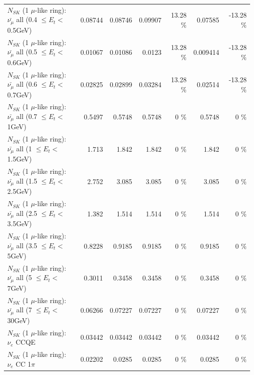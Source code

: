 \begin{table}
\begin{tabular}{| l | r | r | r  r | r  r |}
 $N_{SK}$ (1 $\mu$-like ring): $\bar{\nu_{\mu}}$ all (0.4 $\leq E_{t} <$ 0.5GeV) &         0.08744 &         0.08746 &         0.09907 &    13.28 \%  &         0.07585 &   -13.28 \%  \\ 
 $N_{SK}$ (1 $\mu$-like ring): $\bar{\nu_{\mu}}$ all (0.5 $\leq E_{t} <$ 0.6GeV) &         0.01067 &         0.01086 &          0.0123 &    13.28 \%  &        0.009414 &   -13.28 \%  \\ 
 $N_{SK}$ (1 $\mu$-like ring): $\bar{\nu_{\mu}}$ all (0.6 $\leq E_{t} <$ 0.7GeV) &         0.02825 &         0.02899 &         0.03284 &    13.28 \%  &         0.02514 &   -13.28 \%  \\ 
   $N_{SK}$ (1 $\mu$-like ring): $\bar{\nu_{\mu}}$ all (0.7 $\leq E_{t} <$ 1GeV) &          0.5497 &          0.5748 &          0.5748 &        0 \%  &          0.5748 &        0 \%  \\ 
   $N_{SK}$ (1 $\mu$-like ring): $\bar{\nu_{\mu}}$ all (1 $\leq E_{t} <$ 1.5GeV) &           1.713 &           1.842 &           1.842 &        0 \%  &           1.842 &        0 \%  \\ 
 $N_{SK}$ (1 $\mu$-like ring): $\bar{\nu_{\mu}}$ all (1.5 $\leq E_{t} <$ 2.5GeV) &           2.752 &           3.085 &           3.085 &        0 \%  &           3.085 &        0 \%  \\ 
 $N_{SK}$ (1 $\mu$-like ring): $\bar{\nu_{\mu}}$ all (2.5 $\leq E_{t} <$ 3.5GeV) &           1.382 &           1.514 &           1.514 &        0 \%  &           1.514 &        0 \%  \\ 
   $N_{SK}$ (1 $\mu$-like ring): $\bar{\nu_{\mu}}$ all (3.5 $\leq E_{t} <$ 5GeV) &          0.8228 &          0.9185 &          0.9185 &        0 \%  &          0.9185 &        0 \%  \\ 
     $N_{SK}$ (1 $\mu$-like ring): $\bar{\nu_{\mu}}$ all (5 $\leq E_{t} <$ 7GeV) &          0.3011 &          0.3458 &          0.3458 &        0 \%  &          0.3458 &        0 \%  \\ 
    $N_{SK}$ (1 $\mu$-like ring): $\bar{\nu_{\mu}}$ all (7 $\leq E_{t} <$ 30GeV) &         0.06266 &         0.07227 &         0.07227 &        0 \%  &         0.07227 &        0 \%  \\ 
\hline
\hline
\hline
                                      $N_{SK}$ (1 $\mu$-like ring): $\nu_e$ CCQE &         0.03442 &         0.03442 &         0.03442 &        0 \%  &         0.03442 &        0 \%  \\ 
                                 $N_{SK}$ (1 $\mu$-like ring): $\nu_e$ CC 1$\pi$ &         0.02202 &          0.0285 &          0.0285 &        0 \%  &          0.0285 &        0 \%  \\ 

\end{tabular}
\end{table}

